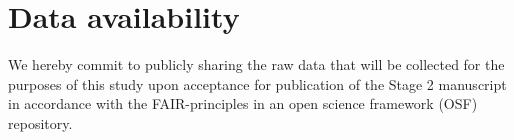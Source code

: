 \documentclass{article}
\begin{document}
\begin{comment}
\mu_{\Delta\lambda_{k}} &\sim \mathcal{N} \left(0,5\right)\\ 
\sigma_{\alpha_{Pl}} &\sim \mathcal{N}^+ \left(0,10\right) \\
\sigma_{\beta_{Pl}} &\sim \mathcal{N}^+\left(0,3\right) \\
\sigma_{\lambda_{Pl}}&\sim\mathcal{N}^+\left(0,3\right) \\
\sigma_{\Delta\alpha_{k}} &\sim \mathcal{N} \left(0,5\right) \\ 
\sigma_{\Delta\beta_{k}} &\sim \mathcal{N} \left(0,5\right)\\ 
\sigma_{\Delta\lambda_{k}} &\sim \mathcal{N} \left(0,5\right)\\ 
L &\sim LKJ \left(2\right)
\end{align*}
\end{comment}

\section{Data availability}
\begin{comment}
    For Registered Reports, public sharing of data and materials upon acceptance for publication of the Stage 2 manuscript is mandatory. Please include a statement committing to sharing your raw data and materials on acceptance of your Stage 2 manuscript. Please deposit any pilot data that you may have already collected. Pilot data should be made accessible for peer-review, but can be placed under embargo until Stage 2 acceptance. 
\end{comment}

We hereby commit to publicly sharing the raw data that will be collected for the purposes of this study upon acceptance for publication of the Stage 2 manuscript in accordance with the FAIR-principles in an open science framework (OSF) repository.
\end{document}
